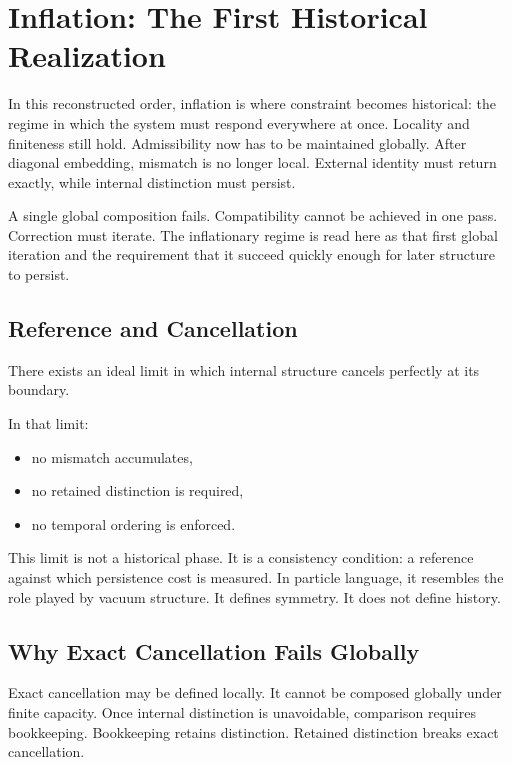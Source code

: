 \documentclass[11pt,twoside,openright]{book}
\begin{document}
\chapter{Inflation: The First Historical Realization}

In this reconstructed order, inflation is where constraint becomes historical: the regime in which the system must respond everywhere at once. Locality and finiteness still hold. Admissibility now has to be maintained globally. After diagonal embedding, mismatch is no longer local. External identity must return exactly, while internal distinction must persist.

A single global composition fails. Compatibility cannot be achieved in one pass. Correction must iterate. The inflationary regime is read here as that first global iteration and the requirement that it succeed quickly enough for later structure to persist.

\section*{Reference and Cancellation}

There exists an ideal limit in which internal structure cancels perfectly at its boundary.

In that limit:

\begin{itemize}
\item no mismatch accumulates,
\item no retained distinction is required,
\item no temporal ordering is enforced.
\end{itemize}

This limit is not a historical phase. It is a consistency condition: a reference against which persistence cost is measured. In particle language, it resembles the role played by vacuum structure. It defines symmetry. It does not define history.

\section*{Why Exact Cancellation Fails Globally}

Exact cancellation may be defined locally. It cannot be composed globally under finite capacity. Once internal distinction is unavoidable, comparison requires bookkeeping. Bookkeeping retains distinction. Retained distinction breaks exact cancellation.
\end{document}
